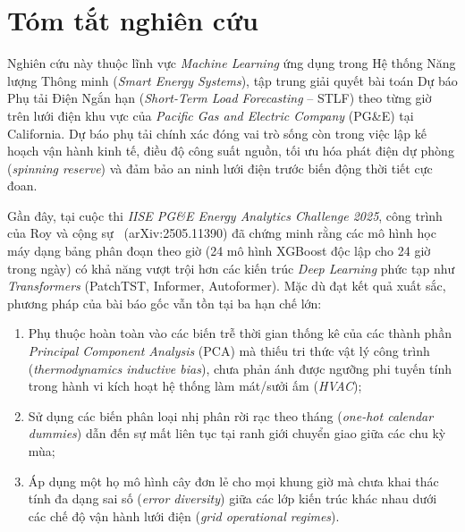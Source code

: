\section{Tóm tắt nghiên cứu}
\label{sec:abstract}

Nghiên cứu này thuộc lĩnh vực \textit{Machine Learning} ứng dụng trong Hệ thống Năng lượng Thông minh (\textit{Smart Energy Systems}), tập trung giải quyết bài toán Dự báo Phụ tải Điện Ngắn hạn (\textit{Short-Term Load Forecasting} -- STLF) theo từng giờ trên lưới điện khu vực của \textit{Pacific Gas and Electric Company} (PG\&E) tại California. Dự báo phụ tải chính xác đóng vai trò sống còn trong việc lập kế hoạch vận hành kinh tế, điều độ công suất nguồn, tối ưu hóa phát điện dự phòng (\textit{spinning reserve}) và đảm bảo an ninh lưới điện trước biến động thời tiết cực đoan.

Gần đây, tại cuộc thi \textit{IISE PG\&E Energy Analytics Challenge 2025}, công trình của Roy và cộng sự~\cite{roy2025hourly} (arXiv:2505.11390) đã chứng minh rằng các mô hình học máy dạng bảng phân đoạn theo giờ (24 mô hình XGBoost độc lập cho 24 giờ trong ngày) có khả năng vượt trội hơn các kiến trúc \textit{Deep Learning} phức tạp như \textit{Transformers} (PatchTST, Informer, Autoformer). Mặc dù đạt kết quả xuất sắc, phương pháp của bài báo gốc vẫn tồn tại ba hạn chế lớn:
\begin{enumerate}
    \item Phụ thuộc hoàn toàn vào các biến trễ thời gian thống kê của các thành phần \textit{Principal Component Analysis} (PCA) mà thiếu tri thức vật lý công trình (\textit{thermodynamics inductive bias}), chưa phản ánh được ngưỡng phi tuyến tính trong hành vi kích hoạt hệ thống làm mát/sưởi ấm (\textit{HVAC});
    \item Sử dụng các biến phân loại nhị phân rời rạc theo tháng (\textit{one-hot calendar dummies}) dẫn đến sự mất liên tục tại ranh giới chuyển giao giữa các chu kỳ mùa;
    \item Áp dụng một họ mô hình cây đơn lẻ cho mọi khung giờ mà chưa khai thác tính đa dạng sai số (\textit{error diversity}) giữa các lớp kiến trúc khác nhau dưới các chế độ vận hành lưới điện (\textit{grid operational regimes}).
\end{enumerate}

